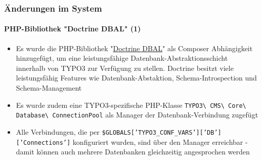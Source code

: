 \begin{frame}[fragile]
	\frametitle{Änderungen im System}
	\framesubtitle{PHP-Bibliothek "Doctrine DBAL" (1)}

	\begin{itemize}

		\item Es wurde die PHP-Bibliothek
			"\href{http://www.doctrine-project.org}{Doctrine DBAL}"
			als Composer Abhängigkeit hinzugefügt, um eine leistungsfähige Datenbank-Abstraktionsschicht
			innerhalb von TYPO3 zur Verfügung zu stellen. Doctrine besitzt viele leistungsfähig Features
			wie Datenbank-Abstaktion, Schema-Introspection und Schema-Management

		\item Es wurde zudem eine TYPO3-spezifische PHP-Klasse
			\smaller
				\texttt{TYPO3\textbackslash
					CMS\textbackslash
					Core\textbackslash
					Database\textbackslash
					ConnectionPool}\normalsize\newline
			als Manager der Datenbank-Verbindung zugefügt

		\item Alle Verbindungen, die per
			\smaller
				\texttt{\$GLOBALS['TYPO3\_CONF\_VARS']['DB']['Connections']}
			\normalsize\newline
			konfiguriert wurden, sind über den Manager erreichbar - damit können auch mehrere Datenbanken
			gleichzeitig angesprochen werden

	\end{itemize}

\end{frame}


